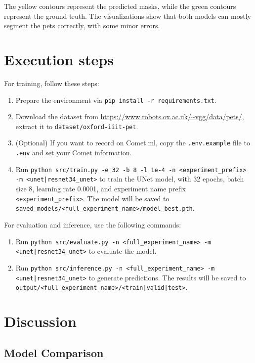 \documentclass{homework}
\begin{document}
The yellow contours represent the predicted masks, while the green contours represent the ground truth. The visualizations show that both models can mostly segment the pets correctly, with some minor errors.

\section{Execution steps}

For training, follow these steps:

\begin{enumerate}
    \item Prepare the environment via \lstinline{pip install -r requirements.txt}.
    \item Download the dataset from \url{https://www.robots.ox.ac.uk/~vgg/data/pets/}, extract it to \lstinline{dataset/oxford-iiit-pet}.
    \item (Optional) If you want to record on Comet.ml, copy the \lstinline{.env.example} file to \lstinline{.env} and set your Comet information.
    \item Run \lstinline{python src/train.py -e 32 -b 8 -l 1e-4 -n <experiment_prefix> -m <unet|resnet34_unet>} to train the UNet model, with 32 epochs, batch size 8, learning rate 0.0001, and experiment name prefix \lstinline{<experiment_prefix>}. The model will be saved to \lstinline{saved_models/<full_experiment_name>/model_best.pth}.
\end{enumerate}

For evaluation and inference, use the following commands:

\begin{enumerate}
    \item Run \lstinline{python src/evaluate.py -n <full_experiment_name> -m <unet|resnet34_unet>} to evaluate the model.
    \item Run \lstinline{python src/inference.py -n <full_experiment_name> -m <unet|resnet34_unet>} to generate predictions. The results will be saved to \lstinline{output/<full_experiment_name>/<train|valid|test>}.
\end{enumerate}

\section{Discussion}

\subsection{Model Comparison}
\end{document}
